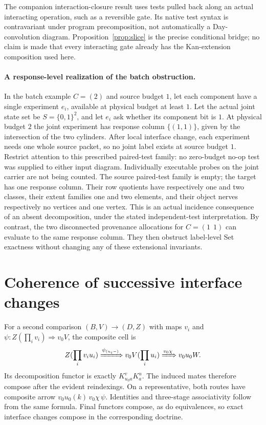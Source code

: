 \documentclass[11pt]{article}
\theoremstyle{definition}\newtheorem{definition}[theorem]{Definition}
\theoremstyle{remark}\newtheorem{remark}[theorem]{Remark}
\begin{document}
The companion interaction-closure result uses tests pulled back along an
actual interacting operation, such as a reversible gate. Its native test
syntax is contravariant under program precomposition, not automatically a
Day-convolution diagram. Proposition~\ref{prop:slice} is the precise
conditional bridge; no claim is made that every interacting gate already
has the Kan-extension composition used here.


\paragraph{A response-level realization of the batch obstruction.}
In the batch example $C=(2)$ and source budget $1$, let each component
have a single experiment $e_i$, available at physical budget at least $1$.
Let the actual joint state set be $S=\{0,1\}^2$, and let $e_i$ ask
whether its component bit is $1$. At physical budget $2$ the joint
experiment has response column $\{(1,1)\}$, given by the intersection
of the two cylinders. After local interface change, each experiment needs
one whole source packet, so no joint label exists at source budget $1$.
Restrict attention to this prescribed paired-test family: no zero-budget
no-op test was supplied to either input diagram. Individually executable
probes on the joint carrier are not being counted. The source paired-test
family is empty; the target has one response column. Their row quotients have respectively one and two classes, their
extent families one and two elements, and their object nerves respectively
no vertices and one vertex. This is an actual incidence consequence of
an absent decomposition, under the stated independent-test interpretation.
By contrast, the two disconnected provenance allocations for $C=(1\ \ 1)$
can evaluate to the same response column. They then obstruct label-level
Set exactness without changing any of these extensional invariants.

\section{Coherence of successive interface changes}
For a second comparison $(B,V)\to(D,Z)$ with maps $v_i$ and
$\psi:Z(\prod_i v_i)\Rightarrow v_0V$, the composite cell is
\[
 Z(\prod_i v_i u_i)
  \xRightarrow{\psi_{(u_i-)}}v_0V(\prod_i u_i)
  \xRightarrow{v_0\chi}v_0u_0W.
\]
Its decomposition functor is exactly
$K^v_{u_0a}K^u_a$. The induced mates therefore compose after the evident
reindexings. On a representative, both routes have composite arrow
$v_0u_0(k)\,v_0\chi\,\psi$. Identities and three-stage associativity
follow from the same formula. Final functors compose, as do equivalences,
so exact interface changes compose in the corresponding doctrine.
\end{document}
